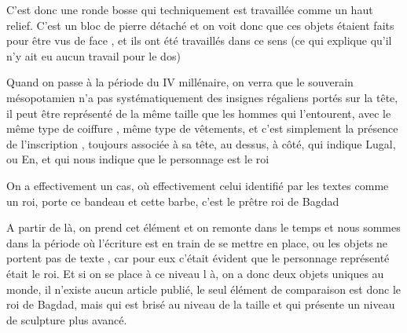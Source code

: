 \documentclass[a4paper]{article}
\begin{document}
{
C'est donc une ronde bosse qui techniquement est travaillée comme un
haut relief. C'est un bloc de pierre détaché et on voit donc que ces
objets étaient faits pour être vus de face , et ils ont été travaillés
dans ce sens (ce qui explique qu'il n'y ait eu aucun travail pour le
dos)}


\bigskip

{
Quand on passe à la période du IV millénaire, on verra que le souverain
mésopotamien n'a pas systématiquement des insignes régaliens portés sur
la tête, il peut être représenté de la même taille que les hommes qui
l'entourent, avec le même type de coiffure , même type de vêtements, et
c'est simplement la présence de l'inscription , toujours associée à sa
tête, au dessus, à côté, qui indique Lugal, ou En, et qui nous indique
que le personnage est le roi}


\bigskip

{
On a effectivement un cas, où effectivement celui identifié par les
textes comme un roi, porte ce bandeau et cette barbe, c'est le prêtre
roi de Bagdad}


\bigskip

{
A partir de là, on prend cet élément et on remonte dans le temps et nous
sommes dans la période où l'écriture est en train de se mettre en
place, ou les objets ne portent pas de texte , car pour eux c'était
évident que le personnage représenté était le roi. Et si on se place à
ce niveau l à, on a donc deux objets uniques au monde, il n'existe
aucun article publié, le seul élément de comparaison est donc le roi de
Bagdad, mais qui est brisé au niveau de la taille et qui présente un
niveau de sculpture plus avancé.}


\bigskip


\bigskip


\bigskip


\bigskip


\bigskip


\bigskip


\bigskip


\bigskip


\bigskip


\bigskip


\bigskip


\bigskip


\bigskip


\bigskip


\bigskip


\bigskip
\end{document}
